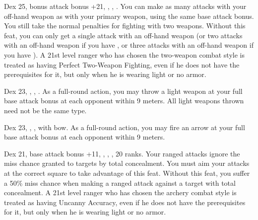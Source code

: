 {}
{Dex 25, bonus attack bonus +21, , , .}
{You can make as many attacks with your off-hand weapon as with your primary weapon, using the same base attack bonus. You still take the normal penalties for fighting with two weapons.}
{Without this feat, you can only get a single attack with an off-hand weapon (or two attacks with an off-hand weapon if you have , or three attacks with an off-hand weapon if you have ).}
{A 21st level ranger who has chosen the two-weapon combat style is treated as having Perfect Two-Weapon Fighting, even if he does not have the prerequisites for it, but only when he is wearing light or no armor.}

{Dex 23, , , .}
{As a full-round action, you may throw a light weapon at your full base attack bonus at each opponent within 9 meters. All light weapons thrown need not be the same type.}

{Dex 23, , ,  with bow.}
{As a full-round action, you may fire an arrow at your full base attack bonus at each opponent within 9 meters.}

{}
{Dex 21, base attack bonus +11, , , ,  20 ranks.}
{Your ranged attacks ignore the miss chance granted to targets by total concealment. You must aim your attacks at the correct square to take advantage of this feat.}
{Without this feat, you suffer a 50\% miss chance when making a ranged attack against a target with total concealment.}
{A 21st level ranger who has chosen the archery combat style is treated as having Uncanny Accuracy, even if he does not have the prerequisites for it, but only when he is wearing light or no armor.}




